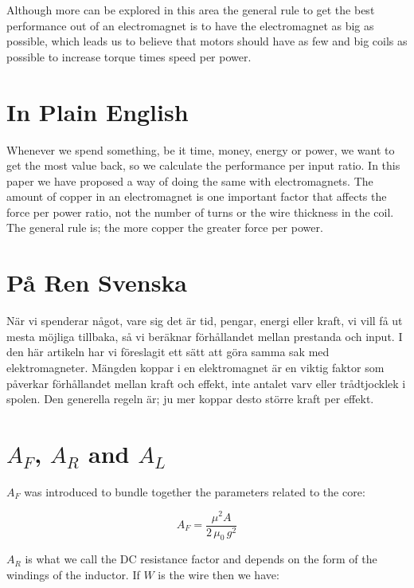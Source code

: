 \documentclass[]{../common/elementary-physics}
\begin{document}
Although more can be explored in this area the general rule to get the best performance out of an electromagnet is to have the electromagnet as big as possible, which leads us to believe that motors should have as few and big coils as possible\cite{jonew} to increase torque times speed per power.

\appendix

\section{In Plain English}

Whenever we spend something, be it time, money, energy or power, we want to get the most value back, so we calculate the performance per input ratio.
In this paper we have proposed a way of doing the same with electromagnets.
The amount of copper in an electromagnet is one important factor that affects the force per power ratio, not the number of turns or the wire thickness in the coil.
The general rule is; the more copper the greater force per power.

\section{På Ren Svenska}

När vi spenderar något, vare sig det är tid, pengar, energi eller kraft, vi vill få ut mesta möjliga tillbaka, så vi beräknar förhållandet mellan prestanda och input.
I den här artikeln har vi föreslagit ett sätt att göra samma sak med elektromagneter.
Mängden koppar i en elektromagnet är en viktig faktor som påverkar förhållandet mellan kraft och effekt, inte antalet varv eller trådtjocklek i spolen.
Den generella regeln är; ju mer koppar desto större kraft per effekt.

\section{$A_F$, $A_R$ and $A_L$}

$A_F$ was introduced to bundle together the parameters related to the core:

\begin{equation}
A_F = \frac{\mu^2 A}{2 \, \mu_0 \, g^2}
\end{equation}

$A_R$ is what we call the DC resistance factor and depends on the form of the windings of the inductor.
If $W$ is the wire then we have:
\end{document}
